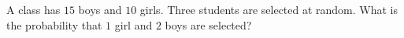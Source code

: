 A class has $15$ boys and $10$ girls. Three students are selected at random. What is the probability that $1$ girl and $2$ boys are selected?
